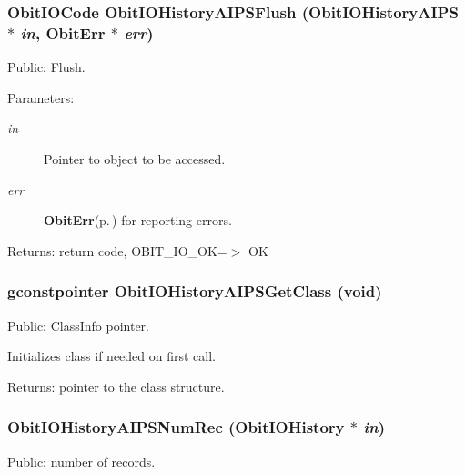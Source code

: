 \subsubsection{\setlength{\rightskip}{0pt plus 5cm}Obit\-IOCode Obit\-IOHistory\-AIPSFlush ({\bf Obit\-IOHistory\-AIPS} $\ast$ {\em in}, {\bf Obit\-Err} $\ast$ {\em err})}\label{ObitIOHistoryAIPS_8h_a16}


Public: Flush. 

\begin{Desc}
\item[Parameters:]
\begin{description}
\item[{\em in}]Pointer to object to be accessed. \item[{\em err}]{\bf Obit\-Err}{\rm (p.\,\pageref{structObitErr})} for reporting errors. \end{description}
\end{Desc}
\begin{Desc}
\item[Returns:]return code, OBIT\_\-IO\_\-OK=$>$ OK \end{Desc}
\subsubsection{\setlength{\rightskip}{0pt plus 5cm}gconstpointer Obit\-IOHistory\-AIPSGet\-Class (void)}\label{ObitIOHistoryAIPS_8h_a7}


Public: Class\-Info pointer. 

Initializes class if needed on first call. \begin{Desc}
\item[Returns:]pointer to the class structure. \end{Desc}
\subsubsection{ Obit\-IOHistory\-AIPSNum\-Rec ({\bf Obit\-IOHistory} $\ast$ {\em in})}\label{ObitIOHistoryAIPS_8h_a19}


Public: number of records. 

